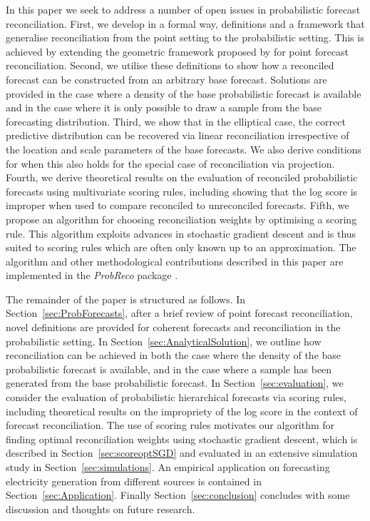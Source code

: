 \documentclass[a4paper,12pt]{article}
\theoremstyle{definition}
\begin{document}
In this paper we seek to address a number of open issues in probabilistic forecast reconciliation. First, we develop in a formal way, definitions and a framework that generalise reconciliation from the point setting to the probabilistic setting. This is achieved by extending the geometric framework proposed by \cite{PanEtAl2020_Geometry} for point forecast reconciliation. Second, we utilise these definitions to show how a reconciled forecast can be constructed from an arbitrary base forecast. Solutions are provided in the case where a density of the base probabilistic forecast is available and in the case where it is only possible to draw a sample from the base forecasting distribution. Third, we show that in the elliptical case, the correct predictive distribution can be recovered via linear reconciliation irrespective of the location and scale parameters of the base forecasts. We also derive conditions for when this also holds for the special case of reconciliation via projection. Fourth, we derive theoretical results on the evaluation of reconciled probabilistic forecasts using multivariate scoring rules, including showing that the log score is improper when used to compare reconciled to unreconciled forecasts. Fifth, we propose an algorithm for choosing reconciliation weights by optimising a scoring rule. This algorithm exploits advances in stochastic gradient descent and is thus suited to scoring rules which are often only known up to an approximation. The algorithm and other methodological contributions described in this paper are implemented in the \emph{ProbReco} package \citep{RProbReco}.

The remainder of the paper is structured as follows. In Section~\ref{sec:ProbForecasts}, after a brief review of point forecast reconciliation, novel definitions are provided for coherent forecasts and reconciliation in the probabilistic setting. In Section~\ref{sec:AnalyticalSolution}, we outline how reconciliation can be achieved in both the case where the density of the base probabilistic forecast is available, and in the case where a sample has been generated from the base probabilistic forecast. In Section~\ref{sec:evaluation}, we consider the evaluation of probabilistic hierarchical forecasts via scoring rules, including theoretical results on the impropriety of the log score in the context of forecast reconciliation. The use of scoring rules motivates our algorithm for finding optimal reconciliation weights using stochastic gradient descent, which is described in Section~\ref{sec:scoreoptSGD} and evaluated in an extensive simulation study in Section~\ref{sec:simulations}. An empirical application on forecasting electricity generation from different sources is contained in Section~\ref{sec:Application}. Finally Section~\ref{sec:conclusion} concludes with some discussion and thoughts on future research.
\end{document}
